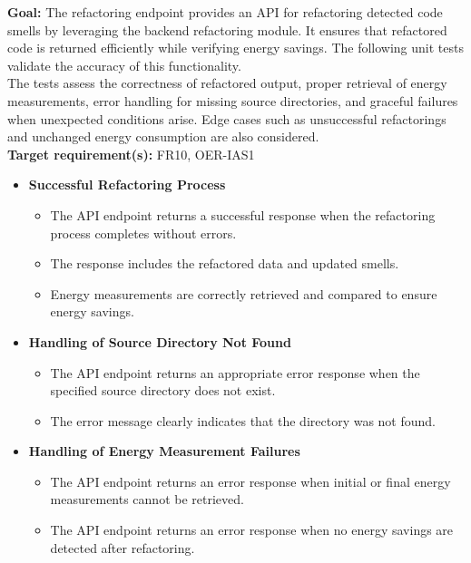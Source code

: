 \documentclass[12pt, titlepage]{article}
\begin{document}
\begin{enumerate}[label={\bf \textcolor{Maroon}{test-SRT-\arabic*}}, wide=0pt, font=\itshape]
\textbf{Goal:} The refactoring endpoint provides an API for refactoring detected code smells by leveraging the backend refactoring module. It ensures that refactored code is returned efficiently while verifying energy savings. The following unit tests validate the accuracy of this functionality.\\

\noindent The tests assess the correctness of refactored output, proper retrieval of energy measurements, error handling for missing source directories, and graceful failures when unexpected conditions arise. Edge cases such as unsuccessful refactorings and unchanged energy consumption are also considered.\\

\noindent\textbf{Target requirement(s):} FR10, OER-IAS1~\cite{SRS} \\

\begin{itemize}
    \item \textbf{Successful Refactoring Process}
    \begin{itemize}
        \item The API endpoint returns a successful response when the refactoring process completes without errors.
        \item The response includes the refactored data and updated smells.
        \item Energy measurements are correctly retrieved and compared to ensure energy savings.
    \end{itemize}

    \item \textbf{Handling of Source Directory Not Found}
    \begin{itemize}
        \item The API endpoint returns an appropriate error response when the specified source directory does not exist.
        \item The error message clearly indicates that the directory was not found.
    \end{itemize}

    \item \textbf{Handling of Energy Measurement Failures}
    \begin{itemize}
        \item The API endpoint returns an error response when initial or final energy measurements cannot be retrieved.
        \item The API endpoint returns an error response when no energy savings are detected after refactoring.
    \end{itemize}


\end{itemize}
\end{enumerate}
\end{document}

